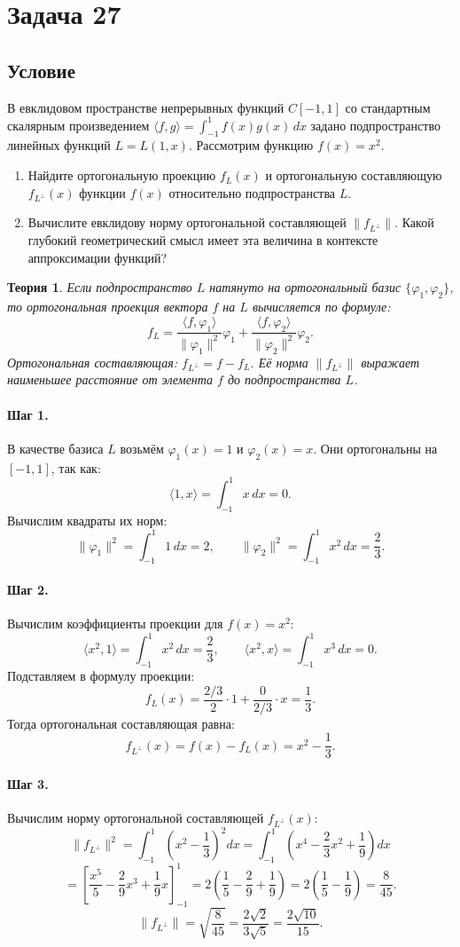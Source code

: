 \documentclass[12pt,a4paper]{article}
\theoremstyle{solution}
\newtheorem*{theory}{Теория}
\newcommand{\task}[1]{\newpage\section*{Задача #1}}
\newcommand{\step}[1]{\paragraph{Шаг #1.}}
\begin{document}
\task{27}
\subsection*{Условие}
В евклидовом пространстве непрерывных функций $C[-1, 1]$ со стандартным скалярным произведением $\displaystyle \langle f, g\rangle = \int_{-1}^1 f(x)g(x)\,dx$ задано подпространство линейных функций $L = L(1, x)$. Рассмотрим функцию $f(x) = x^2$.
\begin{enumerate}
    \item Найдите ортогональную проекцию $f_L(x)$ и ортогональную составляющую $f_{L^\perp}(x)$ функции $f(x)$ относительно подпространства $L$.
    \item Вычислите евклидову норму ортогональной составляющей $\|f_{L^\perp}\|$. Какой глубокий геометрический смысл имеет эта величина в контексте аппроксимации функций?
\end{enumerate}

\begin{theory}
Если подпространство $L$ натянуто на ортогональный базис $\{\varphi_1, \varphi_2\}$, то ортогональная проекция вектора $f$ на $L$ вычисляется по формуле:
\[
f_L = \frac{\langle f, \varphi_1\rangle}{\|\varphi_1\|^2}\varphi_1 + \frac{\langle f, \varphi_2\rangle}{\|\varphi_2\|^2}\varphi_2.
\]
Ортогональная составляющая: $f_{L^\perp} = f - f_L$. Её норма $\|f_{L^\perp}\|$ выражает наименьшее расстояние от элемента $f$ до подпространства $L$.
\end{theory}

\step{1} В качестве базиса $L$ возьмём $\varphi_1(x) = 1$ и $\varphi_2(x) = x$. Они ортогональны на $[-1, 1]$, так как:
\[
\langle 1, x\rangle = \int_{-1}^1 x\,dx = 0.
\]
Вычислим квадраты их норм:
\[
\|\varphi_1\|^2 = \int_{-1}^1 1\,dx = 2, \qquad \|\varphi_2\|^2 = \int_{-1}^1 x^2\,dx = \frac{2}{3}.
\]

\step{2} Вычислим коэффициенты проекции для $f(x) = x^2$:
\[
\langle x^2, 1\rangle = \int_{-1}^1 x^2\,dx = \frac{2}{3}, \qquad \langle x^2, x\rangle = \int_{-1}^1 x^3\,dx = 0.
\]
Подставляем в формулу проекции:
\[
f_L(x) = \frac{2/3}{2} \cdot 1 + \frac{0}{2/3} \cdot x = \frac{1}{3}.
\]
Тогда ортогональная составляющая равна:
\[
f_{L^\perp}(x) = f(x) - f_L(x) = x^2 - \frac{1}{3}.
\]

\step{3} Вычислим норму ортогональной составляющей $f_{L^\perp}(x)$:
\[
\|f_{L^\perp}\|^2 = \int_{-1}^1 \left(x^2 - \frac{1}{3}\right)^2 dx = \int_{-1}^1 \left(x^4 - \frac{2}{3}x^2 + \frac{1}{9}\right) dx
\]
\[
= \left[ \frac{x^5}{5} - \frac{2}{9}x^3 + \frac{1}{9}x \right]_{-1}^1 = 2 \left( \frac{1}{5} - \frac{2}{9} + \frac{1}{9} \right) = 2 \left( \frac{1}{5} - \frac{1}{9} \right) = \frac{8}{45}.
\]
\[
\|f_{L^\perp}\| = \sqrt{\frac{8}{45}} = \frac{2\sqrt{2}}{3\sqrt{5}} = \frac{2\sqrt{10}}{15}.
\]
\end{document}
